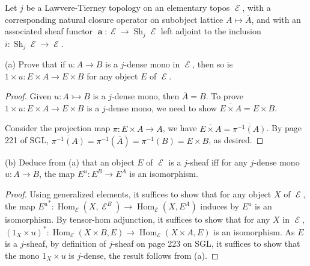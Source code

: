 \documentclass[a4paper]{article}
\title{\hmwkTitle}
\author{\textbf{\hmwkAuthorName}}
\date{\hmwkDueDate}
\DeclareMathOperator{\Hom}{\text {Hom}}
\DeclareMathOperator{\Sh}{\text {Sh}}
\DeclareMathOperator{\E}{\mathcal E}
\DeclareMathOperator{\abf}{\mathbf a}
\begin{document}
\begin{titlepage}
    \maketitle
\end{titlepage}
\begin{question}
    Let $j$ be a Lawvere-Tierney topology on an elementary topos $\E$, with a corresponding natural closure operator on subobject lattice $A\mapsto \overline{A}$, and with an associated sheaf functor $\abf:\E\to \Sh_j\E$ left adjoint to the inclusion $i:\Sh_j\E\to \E$.
\end{question}

(a) Prove that if $u:A\to B$ is a $j$-dense mono in $\E$, then so is $1\times u:E\times A\to E\times B$ for any object $E$ of $\E$.
\begin{proof}
    Given $u: A\rightarrowtail B$ is a $j$-dense mono, then $\overline{A}= B$. To prove $1\times u:E\times A\to E\times B$ is a $j$-dense mono, we need to show $\overline{E\times A} = E\times B$. 

    Consider the projection map $\pi:E\times A\to A$, we have $\overline{E\times A} = \overline{\pi^{-1}(A)}$. By page 221 of SGL, $\overline{\pi^{-1}(A)}= \pi^{-1}(\overline{A})=\pi^{-1}(B)=E\times B$, as desired. 
\end{proof}

(b) Deduce from (a) that an object $E$ of $\E$ is a $j$-sheaf iff for any $j$-dense mono $u:A\to B$, the map $E^u:E^B\to E^A$ is an isomorphism.
\begin{proof}
    Using generalized elements, it suffices to show that for any object $X$ of $\E$, the map ${E^u}^*:\Hom_{\E}(X,\E^B)\to \Hom_{\E}(X,E^A)$ induces by $E^u$ is an isomorphism. By tensor-hom adjunction, it suffices to show that for any $X$ in $\E$, $(1_X\times u)^*:\Hom_{\E}(X\times B,E)\to \Hom_{\E}(X\times A,E)$ is an isomorphism. As $E$ is a $j$-sheaf, by definition of $j$-sheaf on page 223 on SGL, it suffices to show that the mono $1_X\times u$ is $j$-dense, the result follows from (a).
\end{proof}
\end{document}
